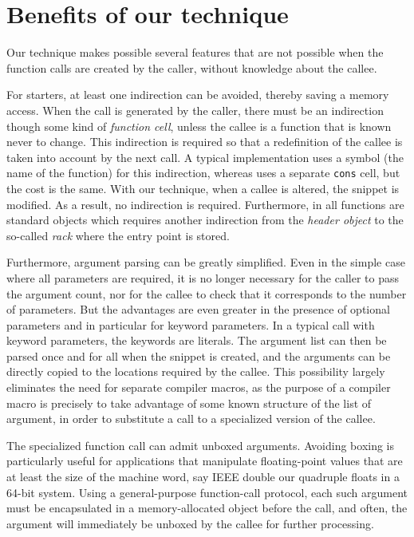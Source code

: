 \section{Benefits of our technique}
\label{sec-benefits}

Our technique makes possible several features that are not possible
when the function calls are created by the caller, without knowledge
about the callee.

For starters, at least one indirection can be avoided, thereby saving
a memory access.  When the call is generated by the caller, there must
be an indirection though some kind of \emph{function cell}, unless the
callee is a function that is known never to change.  This indirection
is required so that a redefinition of the callee is taken into account
by the next call.  A typical \commonlisp{} implementation uses a
symbol (the name of the function) for this indirection, whereas
\sicl{} uses a separate \texttt{cons} cell, but the cost is the same.
With our technique, when a callee is altered, the snippet is
modified.  As a result, no indirection is required.  Furthermore, in
\sicl{} all functions are standard objects which requires another
indirection from the \emph{header object} to the so-called \emph{rack}
where the entry point is stored.

Furthermore, argument parsing can be greatly simplified.  Even in the
simple case where all parameters are required, it is no longer
necessary for the caller to pass the argument count, nor for the
callee to check that it corresponds to the number of parameters.  But
the advantages are even greater in the presence of optional parameters
and in particular for keyword parameters.  In a typical call with
keyword parameters, the keywords are literals.  The argument list can
then be parsed once and for all when the snippet is created, and the
arguments can be directly copied to the locations required by the
callee.  This possibility largely eliminates the need for separate
compiler macros, as the purpose of a compiler macro is precisely to
take advantage of some known structure of the list of argument, in
order to substitute a call to a specialized version of the callee.

The specialized function call can admit unboxed arguments.  Avoiding
boxing is particularly useful for applications that manipulate
floating-point values that are at least the size of the machine word,
say IEEE double our quadruple floats in a 64-bit system.  Using a
general-purpose function-call protocol, each such argument must be
encapsulated in a memory-allocated object before the call, and often,
the argument will immediately be unboxed by the callee for further
processing.

